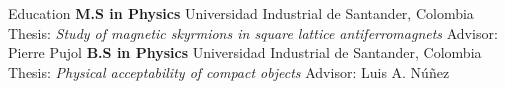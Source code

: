 \begin{rubric}{Education}
\textbf{M.S in Physics} \newline 
Universidad Industrial de Santander, Colombia \newline
Thesis: \emph{Study of magnetic skyrmions in square lattice antiferromagnets}\newline
Advisor: Pierre Pujol
%
\textbf{B.S in Physics} \newline 
Universidad Industrial de Santander, Colombia \newline
Thesis: \emph{Physical acceptability of compact objects}\newline
Advisor: Luis A. Núñez
\end{rubric}